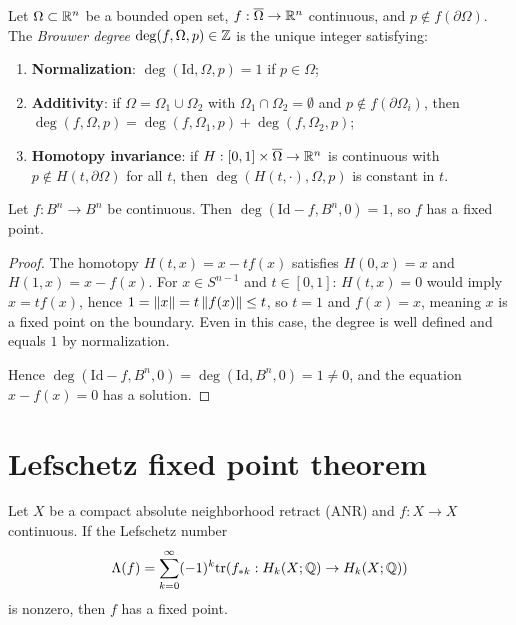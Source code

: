 \begin{definition}
Let $\Omega \subset \mathbb{R}^n$ be a bounded open set, $f : \overline{\Omega} \to \mathbb{R}^n$
continuous, and $p \notin f(\partial\Omega)$. The \emph{Brouwer degree}
$\deg(f, \Omega, p) \in \mathbb{Z}$ is the unique integer satisfying:
\begin{enumerate}
    \item \textbf{Normalization}: $\deg(\mathrm{Id}, \Omega, p) = 1$ if $p \in \Omega$;
    \item \textbf{Additivity}: if $\Omega = \Omega_1 \cup \Omega_2$ with
          $\Omega_1 \cap \Omega_2 = \emptyset$ and $p \notin f(\partial\Omega_i)$,
          then $\deg(f, \Omega, p) = \deg(f, \Omega_1, p) + \deg(f, \Omega_2, p)$;
    \item \textbf{Homotopy invariance}: if $H : [0,1] \times
          \overline{\Omega} \to \mathbb{R}^n$ is continuous with $p \notin H(t, \partial\Omega)$
          for all $t$, then $\deg(H(t, \cdot), \Omega, p)$ is constant in $t$.
\end{enumerate}
\end{definition}

\begin{theorem}
Let $f : B^n \to B^n$ be continuous. Then $\deg(\mathrm{Id} - f, B^n, 0) = 1$,
so $f$ has a fixed point.
\end{theorem}

\begin{proof}
The homotopy $H(t, x) = x - tf(x)$ satisfies $H(0, x) = x$ and
$H(1, x) = x - f(x)$. For $x \in S^{n-1}$ and $t \in [0,1]$:
$H(t, x) = 0$ would imply $x = tf(x)$, hence $1 = \left\| x \right\| = t\left\| f(x) \right\| \leq t$,
so $t = 1$ and $f(x) = x$, meaning $x$ is a fixed point on the boundary. Even
in this case, the degree is well defined and equals $1$ by normalization.

Hence $\deg(\mathrm{Id} - f, B^n, 0) = \deg(\mathrm{Id}, B^n, 0) = 1 \neq 0$,
and the equation $x - f(x) = 0$ has a solution.
\end{proof}

\section{Lefschetz fixed point theorem}

\begin{theorem}[Lefschetz]
Let $X$ be a compact absolute neighborhood retract (ANR) and $f : X \to X$
continuous. If the Lefschetz number
\[
    \Lambda(f) = \sum_{k=0}^{\infty} (-1)^k \mathrm{tr}(f_{*k} : H_k(X; \mathbb{Q}) \to H_k(X; \mathbb{Q}))
\]
is nonzero, then $f$ has a fixed point.
\end{theorem}

